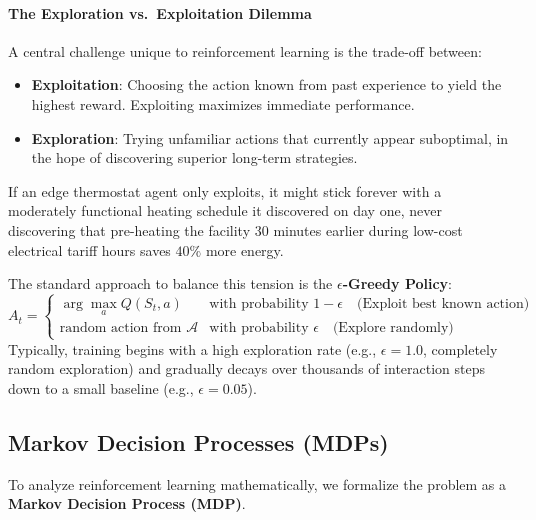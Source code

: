 \paragraph{The Exploration vs.\ Exploitation Dilemma}
A central challenge unique to reinforcement learning is the trade-off between:
\begin{itemize}
    \item \textbf{Exploitation}: Choosing the action known from past experience to yield the highest reward. Exploiting maximizes immediate performance.
    \item \textbf{Exploration}: Trying unfamiliar actions that currently appear suboptimal, in the hope of discovering superior long-term strategies.
\end{itemize}

If an edge thermostat agent only exploits, it might stick forever with a moderately functional heating schedule it discovered on day one, never discovering that pre-heating the facility 30 minutes earlier during low-cost electrical tariff hours saves $40\%$ more energy. 

The standard approach to balance this tension is the \textbf{$\epsilon$-Greedy Policy}:
\begin{equation}
A_t = \begin{cases}
\arg\max_{a} Q(S_t, a) & \text{with probability } 1 - \epsilon \quad \text{(Exploit best known action)} \\
\text{random action from } \mathcal{A} & \text{with probability } \epsilon \quad \text{(Explore randomly)}
\end{cases}\label{eq:eps_greedy}
\end{equation}
Typically, training begins with a high exploration rate (e.g., $\epsilon = 1.0$, completely random exploration) and gradually decays over thousands of interaction steps down to a small baseline (e.g., $\epsilon = 0.05$).

\subsection{Markov Decision Processes (MDPs)}\label{subsec:mdps}

To analyze reinforcement learning mathematically, we formalize the problem as a \textbf{Markov Decision Process (MDP)}.

